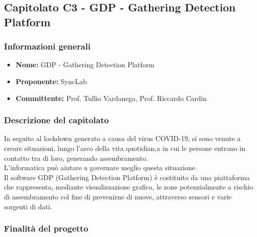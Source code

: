 \subsection{Capitolato C3 - GDP - Gathering Detection Platform}


\subsubsection{Informazioni generali}

\begin{itemize}
	\item{\textbf{Nome:}} GDP - Gathering Detection Platform
	\item{\textbf{Proponente:}} SyncLab
	\item{\textbf{Committente:}} Prof. Tullio Vardanega, Prof. Riccardo Cardin
\end{itemize}



\subsubsection{Descrizione del capitolato}
In seguito al lockdown generato a causa del virus COVID-19, si sono venute a creare situazioni, lungo l'arco della vita quotidian,a in cui le persone entrano in contatto tra di loro, generando assembramento.\\
L’informatica può aiutare a governare meglio questa situazione.\\
Il software GDP (Gathering Detection Platform) è costituito da una piattaforma che rappresenta, mediante visualizzazione grafica, le zone potenzialmente a rischio di assembramento col fine di prevenirne di nuove, attraverso sensori e varie sorgenti di dati.\\


\subsubsection{Finalità del progetto}

